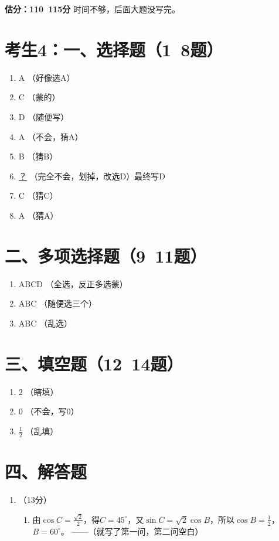 \documentclass[12pt,a4paper]{article}
\begin{document}
\begin{enumerate}[label=\arabic*.]
\begin{enumerate}[label=\arabic*.]
\vspace{1cm}
\begin{flushright}
\textbf{估分：110~115分} \quad 时间不够，后面大题没写完。
\end{flushright}

\section*{考生4：一、选择题（1~8题）}
\begin{enumerate}[label=\arabic*.]
\item A \quad （好像选A）
\item C \quad （蒙的）
\item D \quad （随便写）
\item A \quad （不会，猜A）
\item B \quad （猜B）
\item \underline{？} \quad （完全不会，划掉，改选D）\quad 最终写D
\item C \quad （猜C）
\item A \quad （猜A）
\end{enumerate}

\section*{二、多项选择题（9~11题）}
\begin{enumerate}[label=\arabic*.]
\item ABCD \quad （全选，反正多选蒙）
\item ABC \quad （随便选三个）
\item ABC \quad （乱选）
\end{enumerate}

\section*{三、填空题（12~14题）}
\begin{enumerate}[label=\arabic*.]
\item 2 \quad （瞎填）
\item 0 \quad （不会，写0）
\item $\frac12$ \quad （乱填）
\end{enumerate}

\section*{四、解答题}
\begin{enumerate}[label=\arabic*.]
\item （13分）
\begin{enumerate}[label=(\arabic*)]
\item 由$\cos C=\frac{\sqrt2}{2}$，得$C=45^\circ$，又$\sin C=\sqrt2\cos B$，所以$\cos B=\frac12$，$B=60^\circ$。 ——（就写了第一问，第二问空白）
\end{enumerate}


\end{enumerate}
\end{enumerate}
\end{enumerate}
\end{document}
